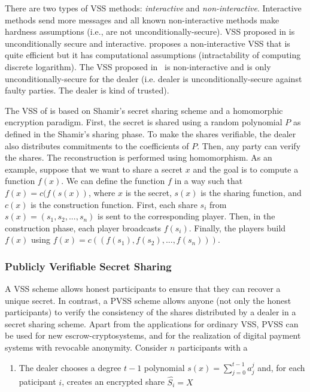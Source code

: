 \documentclass[10pt]{article}
\theoremstyle{plain}
\begin{document}
There are two types of VSS methods: \emph{interactive} and \emph{non-interactive}.
Interactive methods send more messages and all known non-interactive
methods make hardness assumptions (i.e., are not unconditionally-secure).
VSS proposed in \cite{bgw88} is unconditionally secure and interactive.
\cite{Feldman:1987:PSN:1382440.1383000} proposes a non-interactive
VSS that is quite efficient but it has computational assumptions (intractability
of computing discrete logarithm). The VSS proposed in~\cite{pedersen1991threshold}
is non-interactive and is only unconditionally-secure for the dealer
(i.e. dealer is unconditionally-secure against faulty parties. The
dealer is kind of trusted).

The VSS of \cite{Feldman:1987:PSN:1382440.1383000} is based on Shamir's
secret sharing scheme and a homomorphic encryption paradigm. First,
the secret is shared using a random polynomial $P$ as defined in
the Shamir's sharing phase. To make the shares verifiable, the dealer
also distributes commitments to the coefficients of $P$. Then, any
party can verify the shares. The reconstruction is performed using
homomorphism. As an example, suppose that we want to share a secret
$x$ and the goal is to compute a function $f(x)$. We can define
the function $f$ in a way such that $f(x)=c(f(s(x))$, where $x$
is the secret, $s(x)$ is the sharing function, and $c(x)$ is the
construction function. First, each share $s_{i}$ from $s(x)=(s_{1},s_{2},...,s_{n})$
is sent to the corresponding player. Then, in the construction phase,
each player broadcasts $f(s_{i})$. Finally, the players build $f(x)$
using $f(x)=c((f(s_{1}),f(s_{2}),...,f(s_{n})))$.

\subsubsection{Publicly Verifiable Secret Sharing}

A VSS scheme allows honest participants to ensure that they can recover
a unique secret. In contrast, a PVSS scheme allows anyone (not only
the honest participants) to verify the consistency of the shares distributed
by a dealer in a secret sharing scheme. Apart from the applications
for ordinary VSS, PVSS can be used for new escrow-cryptosystems, and
for the realization of digital payment systems with revocable anonymity.
Consider $n$ participants with a 
\begin{enumerate}
	\item The dealer chooses a degree $t-1$ polynomial $s(x)=\sum_{j=0}^{t-1}a_{j}^{j}$
	and, for each paticipant $i$, creates an encrypted share $\hat{S_{i}}=X$ 
\end{enumerate}
\end{document}
